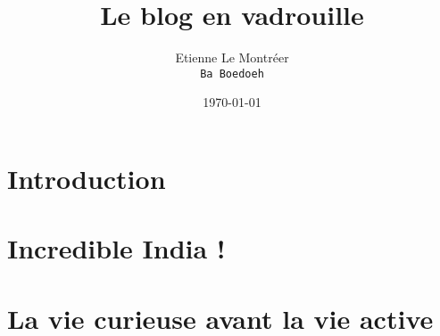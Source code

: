 \documentclass[a5paper, 10pt]{book}
\begin{document}
\frontmatter
\title{Le blog en vadrouille}
\author{Etienne Le Montr\'eer\\
\texttt{Ba Boedoeh}}
\date{\today}

\maketitle

\begin{spacing}{1}
\tableofcontents

\mainmatter

\chapter{Introduction}


\chapter{Incredible India !}

\pagebreak
\pagebreak
\pagebreak
\pagebreak
\pagebreak
\pagebreak
\pagebreak
\pagebreak
\pagebreak
\pagebreak
\pagebreak

\chapter{La vie curieuse avant la vie active}

\pagebreak
\pagebreak
\pagebreak
\pagebreak
\pagebreak
\pagebreak
\pagebreak
\pagebreak
\pagebreak
\pagebreak
\pagebreak
\pagebreak
\pagebreak
\pagebreak
\pagebreak
\pagebreak
\pagebreak
\pagebreak


\end{spacing}
\end{document}
